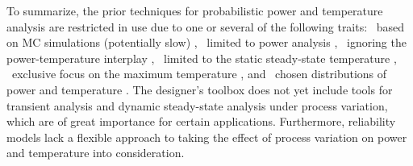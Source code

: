 To summarize, the prior techniques for probabilistic power and temperature
analysis are restricted in use due to one or several of the following traits:
\one~based on \ac{MC} simulations (potentially slow) \cite{chandra2010},
\two~limited to power analysis \cite{bhardwaj2006, ghanta2006, vrudhula2006,
bhardwaj2008, shen2009, chandra2010}, \three~ignoring the power-temperature
interplay \cite{bhardwaj2006, ghanta2006, vrudhula2006, bhardwaj2008,
huang2009a, shen2009}, \four~limited to the static steady-state temperature
\cite{huang2009a, juan2011, juan2012, lee2013}, \five~exclusive focus on the
maximum temperature \cite{juan2011}, and \six~\apriori chosen distributions of
power and temperature \cite{bhardwaj2006, srivastava2010, juan2012}. The
designer's toolbox does not yet include tools for transient analysis and dynamic
steady-state analysis under process variation, which are of great importance for
certain applications. Furthermore, reliability models lack a flexible approach
to taking the effect of process variation on power and temperature into
consideration.
